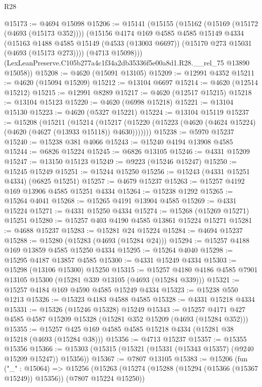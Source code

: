 \begin{lexlean}{R28}
\begin{coremodule}
@15173 := @4694 @15098
@15206 := @15141
    (@15155
      (@15162
        (@15169 (@15172 (@4693 (@15173 @352))))
        (@15156
          @4174
          @169
          @4585
          @4585
          @15149
          @4334
          (@15163
            @1488
            @4585
            @15149
            (@4533 (@13003 @6697))
            (@15170 @273 @15031 (@4693 (@15173 @273))))
          (@4713 @15098)))
      (LexLeanPreserve.C105b277a4c1f34a2db35336f5e00a8d1.R28.__rel_75 @13890 @15058))
@15208 := @4620 (@15091 @13105)
@15209 := @12991 @4352
@15211 := @4620 (@15094 @15209)
@15212 := @13104 @6697
@15214 := @4620 (@12514 @15212)
@15215 := @12991 @8289
@15217 := @4620 (@12517 @15215)
@15218 := @13104 @15123
@15220 := @4620 (@6998 @15218)
@15221 := @13104 @15130
@15223 := @4620 (@5327 @15221)
@15224 := @13104 @15119
@15237 := @15208
    (@15211
      (@15214
        (@15217 (@15220 (@15223 (@4620 (@4624 @15224) (@4620 (@4627 (@13933 @15118)) @4630)))))))
@15238 := @5970 @15237
@15240 := @15238 @381 @4066
@15243 := @15240 @4194 @13908 @4585
@15244 := @6826 @15224
@15245 := @6826 @13105
@15246 := @4331 @15209
@15247 := @13150 @15123
@15249 := @9223 (@15246 @15247)
@15250 := @15245 @15249
@15251 := @15244 @15250
@15256 := @15243 (@4331 @15251 @4334) (@6825 @15251)
@15257 := @4679 @15237
@15263 := @15257 @4192 @169 @13906 @4585 @15251 @4334
@15264 := @15238 @1292
@15265 := @15264 @4041
@15268 := @15265 @4191 @13904 @4585
@15269 := @4331 @15224
@15271 := @4331 @15250 @4334
@15274 := @15268 (@15269 @15271) @15251
@15280 := @15257 @403 @4190 @4585 @13861 @15224 @15271
@15281 := @4688 @15237
@15283 := @15281 @24 @15224
@15284 := @4694 @15237
@15288 := @15280 (@15283 (@4693 (@15284 @24)))
@15294 := @15257 @4188 @169 @13859 @4585 @15250 @4334
@15295 := @15264 @4040
@15298 := @15295 @4187 @13857 @4585
@15300 := @4331 @15249 @4334
@15303 := @15298 (@13106 @15300) @15250
@15315 := @15257 @4180 @4186 @4585 @7901 @13105 @15300 (@15281 @339 @13105 (@4693 (@15284 @339)))
@15321 := @15257 @4184 @169 @4590 @4585 @15249 @4334
@15323 := @15238 @550 @1213
@15326 := @15323 @4183 @4588 @4585
@15328 := @4331 @15218 @4334
@15331 := @15326 (@15246 @15328) @15249
@15343 := @15257 @4171 @427 @4585 @4587 @15209 @15328 (@15281 @352 @15209 (@4693 (@15284 @352)))
@15355 := @15257 @425 @169 @4585 @4585 @15218 @4334 (@15281 @38 @15218 (@4693 (@15284 @38)))
@15356 := @4713 @15237
@15357 := @15355 @15356
@15366 := @15303 (@15315 (@15321 (@15331 (@15343 @15357) (@9240 @15209 @15247)) @15356))
@15367 := @7807 @13105
@15383 := @15206
    (fun ("_" : @15064) =>
    @15256
      (@15263
        (@15274 (@15288 (@15294 (@15366 (@15367 @15249)) @15356)) (@7807 @15224 @15250))

\end{coremodule}
\end{lexlean}
